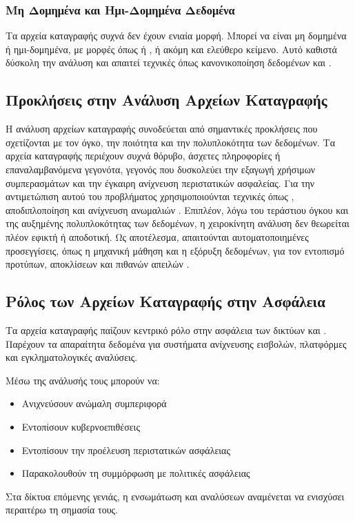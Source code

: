 \subsubsection{Μη Δομημένα και Ημι-Δομημένα Δεδομένα}

Τα αρχεία καταγραφής συχνά δεν έχουν ενιαία μορφή. Μπορεί να είναι μη δομημένα ή ημι-δομημένα, με μορφές όπως  ή , ή ακόμη και ελεύθερο κείμενο. Αυτό καθιστά δύσκολη την ανάλυση και απαιτεί τεχνικές όπως κανονικοποίηση δεδομένων και  \cite{he2017drain}.

\subsection{Προκλήσεις στην Ανάλυση Αρχείων Καταγραφής}

Η ανάλυση αρχείων καταγραφής συνοδεύεται από σημαντικές προκλήσεις που σχετίζονται με τον όγκο, την ποιότητα και την πολυπλοκότητα των δεδομένων. Τα αρχεία καταγραφής περιέχουν συχνά θόρυβο, άσχετες πληροφορίες ή επαναλαμβανόμενα γεγονότα, γεγονός που δυσκολεύει την εξαγωγή χρήσιμων συμπερασμάτων και την έγκαιρη ανίχνευση περιστατικών ασφαλείας. Για την αντιμετώπιση αυτού του προβλήματος χρησιμοποιούνται τεχνικές όπως , αποδιπλοποίηση και ανίχνευση ανωμαλιών \cite{xu2009detecting}. Επιπλέον, λόγω του τεράστιου όγκου και της αυξημένης πολυπλοκότητας των δεδομένων, η χειροκίνητη ανάλυση δεν θεωρείται πλέον εφικτή ή αποδοτική. Ως αποτέλεσμα, απαιτούνται αυτοματοποιημένες προσεγγίσεις, όπως η μηχανική μάθηση και η εξόρυξη δεδομένων, για τον εντοπισμό προτύπων, αποκλίσεων και πιθανών απειλών \cite{garcia2014anomaly}.

\subsection{Ρόλος των Αρχείων Καταγραφής στην Ασφάλεια}

Τα αρχεία καταγραφής παίζουν κεντρικό ρόλο στην ασφάλεια των δικτύων  και . Παρέχουν τα απαραίτητα δεδομένα για συστήματα ανίχνευσης εισβολών, πλατφόρμες  και εγκληματολογικές αναλύσεις.

Μέσω της ανάλυσής τους μπορούν να:
\begin{itemize}
    \item Ανιχνεύσουν ανώμαλη συμπεριφορά
    \item Εντοπίσουν κυβερνοεπιθέσεις
    \item Εντοπίσουν την προέλευση περιστατικών ασφάλειας
    \item Παρακολουθούν τη συμμόρφωση με πολιτικές ασφάλειας
\end{itemize}

Στα δίκτυα επόμενης γενιάς, η ενσωμάτωση  και αναλύσεων  αναμένεται να ενισχύσει περαιτέρω τη σημασία τους.
